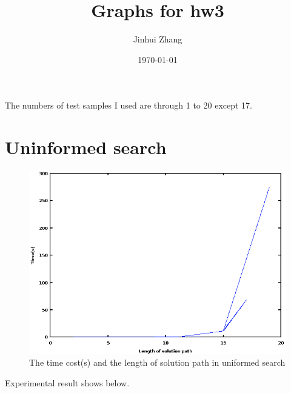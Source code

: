 \documentclass{article}
\begin{document}
\title{Graphs for hw3}
\author{Jinhui Zhang}
\date{\today}

\maketitle
The numbers of test samples I used are through 1 to 20 except 17. 

\section{Uninformed search}
\begin{figure}[h]
\includegraphics[width=1.0\textwidth]{uninformed.png}
\caption{The time cost(s) and the length of solution path in uniformed search}
\end{figure}
Experimental result shows below. 
\end{document}
